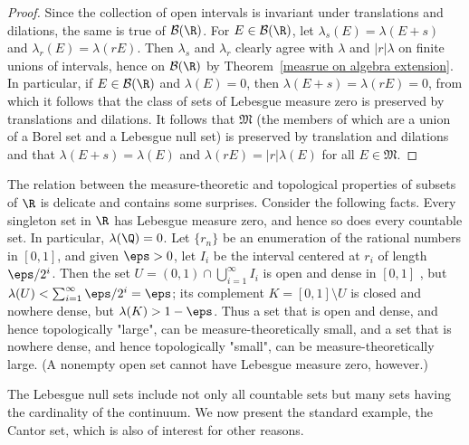 \begin{proof}
Since the collection of open intervals is invariant under translations and
dilations, the same is true of $\mathcal{B}(\R)$. For $E\in\mathcal{B}(\R)$, let $\lambda_s(E)=\lambda(E+s)$ and $\lambda_r(E)=\lambda(rE)$. Then $\lambda_s$ and $\lambda_r$ clearly agree with $\lambda$ and $|r|\lambda$ on finite unions of intervals, hence on $\mathcal{B}(\R)$ by Theorem~\ref{measrue on algebra extension}. In particular, if $E\in\mathcal{B}(\R)$ and $\lambda(E)=0$, then $\lambda(E+s)=\lambda(rE)=0$, from which it follows that the class of sets of Lebesgue measure zero is preserved by translations and dilations. It follows that $\mathfrak{M}$ (the members of which are a union of a Borel set and a Lebesgue null set) is preserved
by translation and dilations and that $\lambda(E+s)=\lambda(E)$ and $\lambda(rE)=|r|\lambda(E)$ for all $E\in\mathfrak{M}$.
\end{proof}
The relation between the measure-theoretic and topological properties of subsets of $\R$ is delicate and contains some surprises. Consider the following facts. Every singleton set in $\R$ has Lebesgue measure zero, and hence so does every countable set. In particular, $\lambda(\Q)=0$. Let $\{r_n\}$ be an enumeration of the rational numbers in $[0,1]$, and given $\eps>0$, let $I_i$ be the interval centered at $r_i$ of length $\eps/2^i$. Then
the set $U=(0,1)\cap\bigcup_{i=1}^{\infty}I_i$ is open and dense in $[0,1]$ , but $\lambda(U)<\sum_{i=1}^{\infty}\eps/2^i=\eps$; its complement $K=[0,1]\setminus U$ is closed and nowhere dense, but $\lambda(K)>1-\eps$. Thus a set that is open and dense, and hence topologically "large", can be measure-theoretically small, and a set that is nowhere dense, and hence topologically "small", can be measure-theoretically large. (A nonempty open set cannot have Lebesgue measure zero, however.)\par
The Lebesgue null sets include not only all countable sets but many sets having the cardinality of the continuum. We now present the standard example, the Cantor set, which is also of interest for other reasons.
